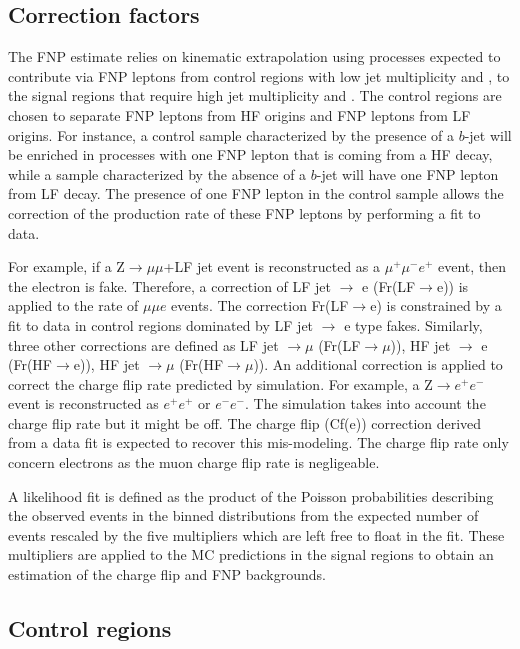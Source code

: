 \subsection{Correction factors}

The FNP estimate relies on kinematic extrapolation using processes expected to contribute via FNP leptons from control regions 
with low jet multiplicity and \met, to the signal regions that require high jet multiplicity and \met. 
The control regions are chosen to separate FNP leptons from HF origins and FNP leptons from LF origins.
For instance, a control sample characterized by the presence of a $b$-jet will be enriched in processes with one FNP lepton that is 
coming from a HF decay, while a sample characterized by the absence of a $b$-jet will have one FNP lepton from LF decay.
The presence of one FNP lepton in the control sample allows the correction of the production rate of these FNP leptons 
by performing a fit to data. 

For example, if a Z$\to\mu\mu$+LF jet event is reconstructed as a $\mu^+\mu^-e^+$ event, then the electron is fake.
Therefore, a correction of LF jet $\to$ e (Fr(LF$\to$e)) is applied to the rate of $\mu\mu e$ events. The correction Fr(LF$\to$e)
is constrained by a fit to data in control regions dominated by LF jet $\to$ e type fakes. 
Similarly, three other corrections are defined as LF jet $\to\mu$ (Fr(LF$\to\mu$)),  HF jet $\to$ e (Fr(HF$\to$e)),  
HF jet $\to\mu$ (Fr(HF$\to\mu$)). An additional correction is applied to correct the charge flip rate predicted by simulation.
For example, a Z$\to e^+e^-$ event is reconstructed as $e^+e^+$ or $e^-e^-$. The simulation takes into account the charge flip 
rate but it might be off. The charge flip (Cf(e)) correction derived from a data fit is expected to recover this mis-modeling.
The charge flip rate only concern electrons as the muon charge flip rate is negligeable.

A likelihood fit is defined as the product of the Poisson probabilities describing the observed events in the binned 
distributions from the expected number of events rescaled by the five multipliers which are left free to float in the fit.  
These multipliers are applied to the MC predictions in the signal regions to obtain an estimation of the charge flip and FNP backgrounds.

\subsection{Control regions}

